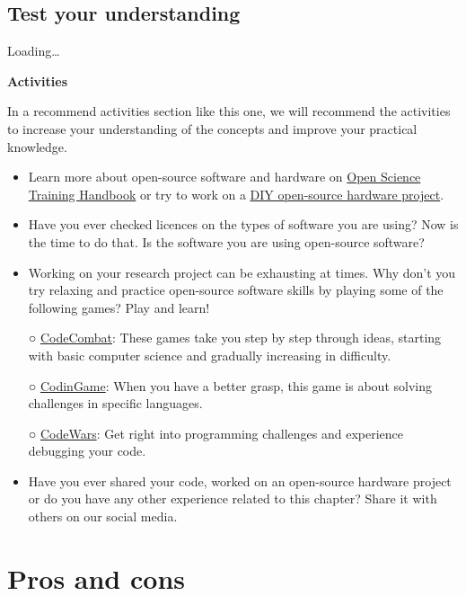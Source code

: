 \documentclass[
]{book}
\begin{document}
\hypertarget{test-your-understanding-2}{%
\section{Test your understanding}\label{test-your-understanding-2}}

Loading\ldots{}

\textbf{Activities}

In a recommend activities section like this one, we will recommend the activities to increase your understanding of the concepts and improve your practical knowledge.

\begin{itemize}
\item
  Learn more about open-source software and hardware on \href{https://open-science-training-handbook.gitbook.io/book/open-science-basics/open-research-software-and-open-source}{Open Science Training Handbook} or try to work on a \href{https://en.wikipedia.org/wiki/List_of_open-source_hardware_projects}{DIY open-source hardware project}.
\item
  Have you ever checked licences on the types of software you are using? Now is the time to do that. Is the software you are using open-source software?
\item
  Working on your research project can be exhausting at times. Why don't you try relaxing and practice open-source software skills by playing some of the following games? Play and learn!

  ○ \href{https://codecombat.com/}{CodeCombat}: These games take you step by step through ideas, starting with basic computer science and gradually increasing in difficulty.

  ○ \href{https://www.codingame.com/start}{CodinGame}: When you have a better grasp, this game is about solving challenges in specific languages.

  ○ \href{https://www.codewars.com/}{CodeWars}: Get right into programming challenges and experience debugging your code.
\item
  Have you ever shared your code, worked on an open-source hardware project or do you have any other experience related to this chapter? Share it with others on our social media.
\end{itemize}

\hypertarget{pros-and-cons}{%
\chapter{Pros and cons}\label{pros-and-cons}}
\end{document}
